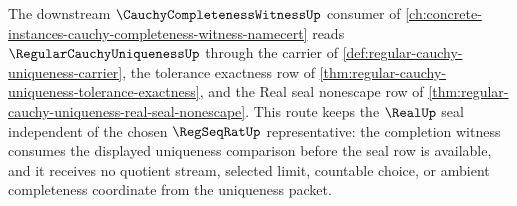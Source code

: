 The downstream $\CauchyCompletenessWitnessUp$ consumer of \autoref{ch:concrete-instances-cauchy-completeness-witness-namecert} reads $\RegularCauchyUniquenessUp$ through the carrier of \autoref{def:regular-cauchy-uniqueness-carrier}, the tolerance exactness row of \autoref{thm:regular-cauchy-uniqueness-tolerance-exactness}, and the Real seal nonescape row of \autoref{thm:regular-cauchy-uniqueness-real-seal-nonescape}. This route keeps the $\RealUp$ seal independent of the chosen $\RegSeqRatUp$ representative: the completion witness consumes the displayed uniqueness comparison before the seal row is available, and it receives no quotient stream, selected limit, countable choice, or ambient completeness coordinate from the uniqueness packet.
